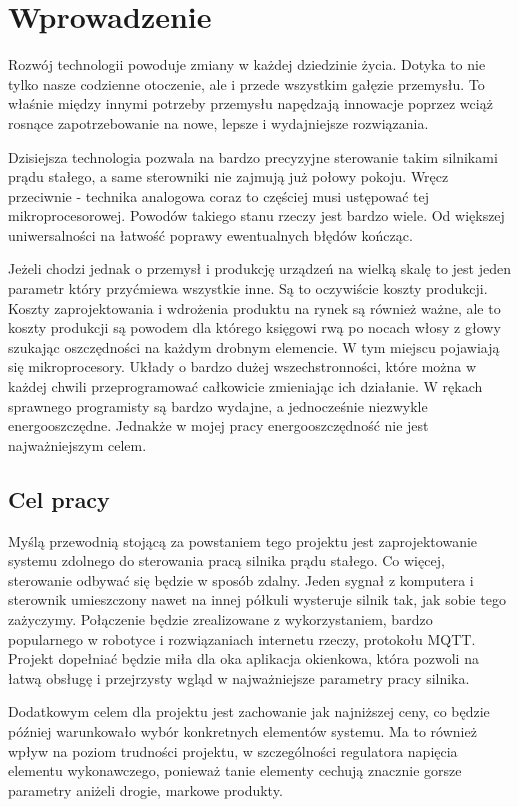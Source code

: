   \chapter{Wprowadzenie}
  
    Rozwój technologii powoduje zmiany w każdej dziedzinie życia. Dotyka to nie tylko nasze codzienne otoczenie, ale i przede wszystkim gałęzie przemysłu. To właśnie między innymi potrzeby przemysłu napędzają innowacje poprzez wciąż rosnące zapotrzebowanie na nowe, lepsze i wydajniejsze rozwiązania. 
    
    Dzisiejsza technologia pozwala na bardzo precyzyjne sterowanie takim silnikami prądu stałego, a same sterowniki nie zajmują już połowy pokoju. Wręcz przeciwnie - technika analogowa coraz to częściej musi ustępować tej mikroprocesorowej. Powodów takiego stanu rzeczy jest bardzo wiele. Od większej uniwersalności na łatwość poprawy ewentualnych błędów kończąc. 
    
    Jeżeli chodzi jednak o przemysł i produkcję urządzeń na wielką skalę to jest jeden parametr który przyćmiewa wszystkie inne. Są to oczywiście koszty produkcji. Koszty zaprojektowania i wdrożenia produktu na rynek są również ważne, ale to koszty produkcji są powodem dla którego księgowi rwą po nocach włosy z głowy szukając oszczędności na każdym drobnym elemencie. W tym miejscu pojawiają się mikroprocesory. Układy o bardzo dużej wszechstronności, które można w każdej chwili przeprogramować całkowicie zmieniając ich działanie. W rękach sprawnego programisty są bardzo wydajne, a jednocześnie niezwykle energooszczędne. Jednakże w mojej pracy energooszczędność nie jest najważniejszym celem. 
    
    \section{Cel pracy}
        Myślą przewodnią stojącą za powstaniem tego projektu jest zaprojektowanie systemu zdolnego do sterowania pracą silnika prądu stałego. Co więcej, sterowanie odbywać się będzie w sposób zdalny. Jeden sygnał z komputera i sterownik umieszczony nawet na innej półkuli wysteruje silnik tak, jak sobie tego zażyczymy. Połączenie będzie zrealizowane z wykorzystaniem, bardzo popularnego w robotyce i rozwiązaniach internetu rzeczy, protokołu MQTT. Projekt dopełniać będzie miła dla oka aplikacja okienkowa, która pozwoli na łatwą obsługę i przejrzysty wgląd w najważniejsze parametry pracy silnika. 
        
        Dodatkowym celem dla projektu jest zachowanie jak najniższej ceny, co będzie później warunkowało wybór konkretnych elementów systemu. Ma to również wpływ na poziom trudności projektu, w szczególności regulatora napięcia elementu wykonawczego, ponieważ tanie elementy cechują znacznie gorsze parametry aniżeli drogie, markowe produkty.
    

 
